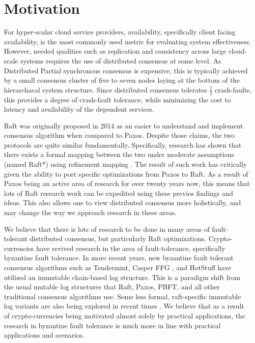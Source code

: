 \section{Motivation}
For hyper-scalar cloud service providers, availability, specifically client facing availability, is the most commonly used metric for evaluating system effectiveness.
However, needed qualities such as replication and consistency across large cloud-scale systems requires the use of distributed consensus at some level. 
As Distributed Partial synchronous consensus is expensive, this is typically achieved by a small consensus cluster of five to seven nodes laying at the bottom of the hierarchacal system structure.
Since distributed consensus tolerates $\frac{1}{2}$ crash-faults, this provides a degree of crash-fault tolerance, while minimizing the cost to latency and availability of the dependent services. 

Raft was originally proposed in 2014 as an easier to understand and implement consensus algorithm when compared to Paxos. Despite those claims, the two protocols are quite similar fundamentally.
Specifically, research has shown that there exists a formal mapping between the two under moderate assumptions (named Raft*) using refinement mapping \cite{10.1145/3293611.3331595}.
The result of such work has critically given the ability to port specific optimizations from Paxos to Raft.
As a result of Paxos being an active area of research for over twenty years now, this means that lots of Raft research work can be expedited using these previos findings and ideas.
This also allows one to view distributed consensus more holistically, and may change the way we approach research in these areas. 

We believe that there is lots of research to be done in many areas of fault-tolerant distributed consensus, but particularly Raft optimizations. 
Crypto-currencies have revived research in the area of fault-tolerance, specifically byzantine fault tolerance. 
In more recent years, new byzantine fault tolerant consensus algorithms such as Tendermint, Casper FFG \cite{DBLP:journals/corr/abs-1710-09437}, and HotStuff \cite{yin_malkhi_reiter_gueta_abraham_2019} have utilized an immutable chain-based log structure. 
This is a paradigm shift from the usual mutable log structures that Raft, Paxos, PBFT, and all other traditional consensus algorithms use.
Some less formal, raft-specific immutable log variants are also being explored in recent times \cite{howard_2021}. 
We believe that as a result of crypto-currencies being motivated almost solely by practical applications, the research in byzantine fault tolerance is much more in line with practical applications and scenarios.

